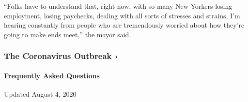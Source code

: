 ``Folks have to understand that, right now, with so many New Yorkers
losing employment, losing paychecks, dealing with all sorts of stresses
and strains, I'm hearing constantly from people who are tremendously
worried about how they're going to make ends meet,'' the mayor said.

\href{https://www.nytimes3xbfgragh.onion/news-event/coronavirus?action=click\&pgtype=Article\&state=default\&region=MAIN_CONTENT_3\&context=storylines_faq}{}

\hypertarget{the-coronavirus-outbreak-}{%
\subsubsection{The Coronavirus Outbreak
›}\label{the-coronavirus-outbreak-}}

\hypertarget{frequently-asked-questions}{%
\paragraph{Frequently Asked
Questions}\label{frequently-asked-questions}}

Updated August 4, 2020

